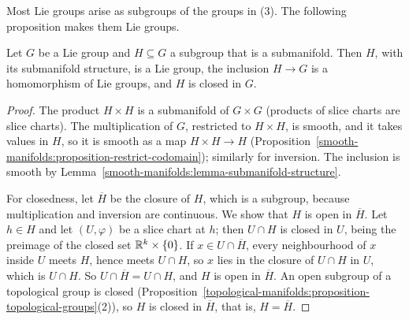 Most Lie groups arise as subgroups of the groups in (3). The following proposition makes them Lie groups.

\begin{proposition}\label{lie-groups:proposition-lie-subgroup}
Let $G$ be a Lie group and $H \subseteq G$ a subgroup that is a submanifold. Then $H$, with its submanifold structure, is a Lie group, the inclusion
$H \to G$ is a homomorphism of Lie groups, and $H$ is closed in $G$.
\end{proposition}

\begin{proof}
The product $H \times H$ is a submanifold of $G \times G$ (products of slice charts are slice charts). The multiplication of $G$, restricted to
$H \times H$, is smooth, and it takes values in $H$, so it is smooth as a map $H \times H \to H$ (Proposition~\ref{smooth-manifolds:proposition-restrict-codomain});
similarly for inversion. The inclusion is smooth by Lemma~\ref{smooth-manifolds:lemma-submanifold-structure}.

For closedness, let $\overline{H}$ be the closure of $H$, which is a subgroup, because multiplication and inversion are continuous. We show that $H$ is open in
$\overline{H}$. Let $h \in H$ and let $(U, \varphi)$ be a slice chart at $h$; then $U \cap H$ is closed in $U$, being the preimage of the closed set
$\mathbb{R}^k \times \{0\}$. If $x \in U \cap \overline{H}$, every neighbourhood of $x$ inside $U$ meets $H$, hence meets $U \cap H$, so $x$ lies in the closure of
$U \cap H$ in $U$, which is $U \cap H$. So $U \cap \overline{H} = U \cap H$, and $H$ is open in $\overline{H}$. An open subgroup of a topological group is closed
(Proposition~\ref{topological-manifolds:proposition-topological-groups}(2)), so $H$ is closed in $\overline{H}$, that is, $H = \overline{H}$.
\end{proof}

